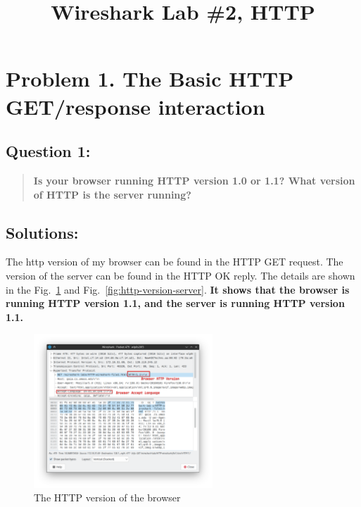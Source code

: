 \documentclass{cshwk}
\title{Wireshark Lab \#2, HTTP}
\begin{document}
\maketitle

\section*{Problem 1. The Basic HTTP GET/response interaction}

\subsection*{Question 1:}

\begin{quote}
    \textbf{Is your browser running HTTP version 1.0 or 1.1? What version of HTTP is the server running?}
\end{quote}

\subsection*{Solutions:}

The http version of my browser can be found in the HTTP GET request. The version of the server can be found in the HTTP OK reply. The details are shown in the Fig.~\ref{fig:http-version-browser} and Fig.~\ref{fig:http-version-server}. \textbf{It shows that the browser is running HTTP version 1.1, and the server is running HTTP version 1.1.}

\begin{figure}[htbp]
    \centering
    \includegraphics[width=0.6\textwidth]{lab2-1.png}
    \caption{The HTTP version of the browser}
    \label{fig:http-version-browser}
\end{figure}
\end{document}
